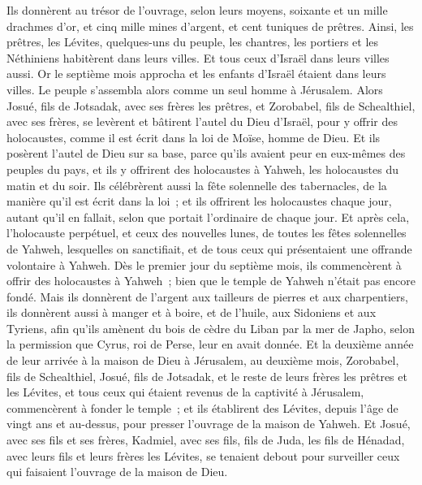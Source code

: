 \begin{multicols}{2}
Ils donnèrent au trésor de l'ouvrage, selon leurs moyens, soixante et un mille drachmes d'or, et cinq mille mines d'argent, et cent tuniques de prêtres.
Ainsi, les prêtres, les Lévites, quelques-uns du peuple, les chantres, les portiers et les Néthiniens habitèrent dans leurs villes. Et tous ceux d'Israël dans leurs villes aussi.
\VerseOne{}Or le septième mois approcha et les enfants d'Israël étaient dans leurs villes. Le peuple s'assembla alors comme un seul homme à Jérusalem.
Alors Josué, fils de Jotsadak, avec ses frères les prêtres, et Zorobabel, fils de Schealthiel, avec ses frères, se levèrent et bâtirent l'autel du Dieu d'Israël, pour y offrir des holocaustes, comme il est écrit dans la loi de Moïse, homme de Dieu.
Et ils posèrent l'autel de Dieu sur sa base, parce qu'ils avaient peur en eux-mêmes des peuples du pays, et ils y offrirent des holocaustes à Yahweh, les holocaustes du matin et du soir.
Ils célébrèrent aussi la fête solennelle des tabernacles, de la manière qu'il est écrit dans la loi~; et ils offrirent les holocaustes chaque jour, autant qu'il en fallait, selon que portait l'ordinaire de chaque jour.
Et après cela, l'holocauste perpétuel, et ceux des nouvelles lunes, de toutes les fêtes solennelles de Yahweh, lesquelles on sanctifiait, et de tous ceux qui présentaient une offrande volontaire à Yahweh.
Dès le premier jour du septième mois, ils commencèrent à offrir des holocaustes à Yahweh~; bien que le temple de Yahweh n'était pas encore fondé.
Mais ils donnèrent de l'argent aux tailleurs de pierres et aux charpentiers, ils donnèrent aussi à manger et à boire, et de l'huile, aux Sidoniens et aux Tyriens, afin qu'ils amènent du bois de cèdre du Liban par la mer de Japho, selon la permission que Cyrus, roi de Perse, leur en avait donnée.
Et la deuxième année de leur arrivée à la maison de Dieu à Jérusalem, au deuxième mois, Zorobabel, fils de Schealthiel, Josué, fils de Jotsadak, et le reste de leurs frères les prêtres et les Lévites, et tous ceux qui étaient revenus de la captivité à Jérusalem, commencèrent à fonder le temple~; et ils établirent des Lévites, depuis l'âge de vingt ans et au-dessus, pour presser l'ouvrage de la maison de Yahweh.
Et Josué, avec ses fils et ses frères, Kadmiel, avec ses fils, fils de Juda, les fils de Hénadad, avec leurs fils et leurs frères les Lévites, se tenaient debout pour surveiller ceux qui faisaient l'ouvrage de la maison de Dieu.

\end{multicols}

